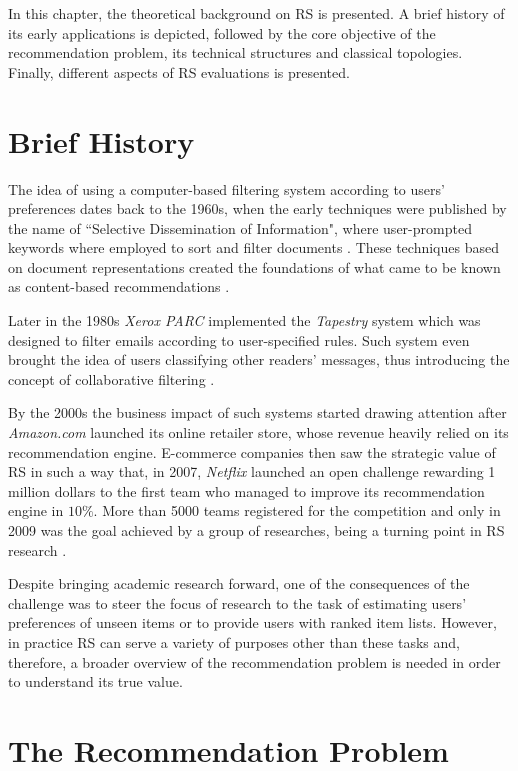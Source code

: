 In this chapter, the theoretical background on RS is presented. A brief history of its early applications is depicted, followed by the core objective of the recommendation problem, its technical structures and classical topologies. Finally, different aspects of RS evaluations is presented.

\section{Brief History}

    The idea of using a computer-based filtering system according to users' preferences dates back to  the 1960s, when the early techniques were published by the name of ``Selective Dissemination of Information", where user-prompted keywords where employed to sort and filter documents \cite{1963SDI}. These techniques based on document representations created the foundations of what came to be known as content-based recommendations \cite{2016BeyondMatrixCompletion}. 

    Later in the 1980s \textit{Xerox PARC} implemented the \textit{Tapestry} system which was designed to filter emails according to user-specified rules. Such system even brought the idea of users     classifying other readers' messages, thus introducing the concept of collaborative filtering    \cite{2016BeyondMatrixCompletion}.

    By the 2000s the business impact of such systems started drawing attention after    \textit{Amazon.com} launched its online retailer store, whose revenue heavily relied on its recommendation engine. E-commerce companies then saw the strategic value of RS in such a way that, in 2007, \textit{Netflix} launched an open challenge rewarding 1 million dollars to the first team who managed to improve its recommendation engine in $10 \%$. More than 5000 teams registered for the competition and only in 2009 was the goal achieved by a group of researches, being a turning point in RS research \cite{2007TheNetflixPrize}.
    
    Despite bringing academic research forward, one of the consequences of the challenge was to steer  the focus of research to the task of estimating users' preferences of unseen items or to provide users with ranked item lists. However, in practice RS can serve a variety of purposes other than these tasks and, therefore, a broader overview of the recommendation problem is needed in order to understand its true value.

  \section{The Recommendation Problem}

